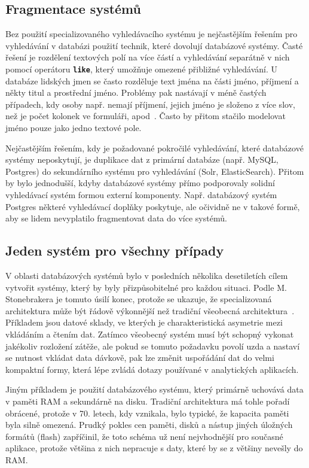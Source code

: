 \documentclass[11pt,letterpaper,oneside,openright]{book}
\newcommand{\bftt}[1]{\texttt{\textbf{#1}}}
\begin{document}
\subsection{Fragmentace systémů}
Bez použití specializovaného vyhledávacího systému je nejčastějším řešením pro
vyhledávání v databázi použití technik, které dovolují databázové systémy.
Časté řešení je rozdělení textových polí na více částí a vyhledávání separátně
v nich pomocí operátoru \bftt{like}, který umožňuje omezené přibližné
vyhledávání. U databáze lidských jmen se často rozděluje text jména na části
jméno, příjmení a někty titul a prostřední jméno. Problémy pak nastávají v méně
častých případech, kdy osoby např. nemají příjmení, jejich jméno je složeno z
více slov, než je počet kolonek ve formuláři, apod~\cite{name_falsehoods}.
Často by přitom stačilo modelovat jméno pouze jako jedno textové pole.

Nejčastějším řešením, kdy je požadované pokročilé vyhledávání, které databázové
systémy neposkytují, je duplikace dat z primární databáze (např. MySQL,
Postgres) do sekundárního systému pro vyhledávání (Solr, ElasticSearch). Přitom
by bylo jednodušší, kdyby databázové systémy přímo podporovaly solidní
vyhledávací systém formou externí komponenty. Např. databázový systém Postgres
některé vyhledávací doplňky poskytuje, ale očividně ne v takové formě, aby se
lidem nevyplatilo fragmentovat data do více systémů. 


\subsection{Jeden systém pro všechny případy}
V oblasti databázových systémů bylo v posledních několika desetiletích cílem
vytvořit systémy, který by byly přizpůsobitelné pro každou situaci. Podle M.
Stonebrakera je tomuto úsilí konec, protože se ukazuje, že specializovaná
architektura může být řádově výkonnější než tradiční všeobecná
architektura~\cite{Stonebraker:2005:OSF:1053724.1054024}. Příkladem jsou datové
sklady, ve kterých je charakteristická asymetrie mezi vkládáním a čtením dat.
Zatímco všeobecný systém musí být schopný vykonat jakékoliv rozložení zátěže,
ale pokud se tomuto požadavku povolí uzda a nastaví se nutnost vkládat data
dávkově, pak lze změnit uspořádání dat do velmi kompaktní formy, která lépe
zvládá dotazy používané v analytických aplikacích.

Jiným příkladem je použití databázového systému, který primárně uchovává data v
paměti RAM a sekundárně na disku. Tradiční architektura má tohle pořadí
obrácené, protože v 70. letech, kdy vznikala, bylo typické, že kapacita paměti
byla silně omezená. Prudký pokles cen paměti, disků a nástup jiných úložných
formátů (flash) zapříčinil, že toto schéma už není nejvhodnější pro současné
aplikace, protože většina z nich nepracuje s daty, které by se z většiny
nevešly do RAM.
\end{document}
